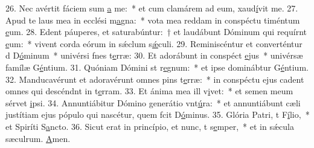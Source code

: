 26. Nec avértit fáciem sum \uline{a} me:~* et cum clamárem ad eum, xaud\uline{í}vit me.
27. Apud te laus mea in ecclési m\uline{a}gna:~* vota mea reddam in conspéctu timéntum \uline{e}um.
28. Edent páuperes, et saturabúntur:~† et laudábunt Dóminum qui requírnt \uline{e}um:~* vivent corda eórum in sǽclum s\uline{ǽ}culi.
29. Reminiscéntur et converténtur d D\uline{ó}minum~* univérsi fnes t\uline{e}rræ:
30. Et adorábunt in conspéct \uline{e}jus~* univérsæ famílæ G\uline{é}ntium.
31. Quóniam Dómini st r\uline{e}gnum:~* et ipse dominábtur G\uline{é}ntium.
32. Manducavérunt et adoravérunt omnes pins t\uline{e}rræ:~* in conspéctu ejus cadent omnes qui descéndnt in t\uline{e}rram.
33. Et ánima mea ill v\uline{i}vet:~* et semen meum sérvet \uline{i}psi.
34. Annuntiábitur Dómino generátio vnt\uline{ú}ra:~* et annuntiábunt cæli justítiam ejus pópulo qui nascétur, quem fcit D\uline{ó}minus.
35. Glória Patri, t F\uline{í}lio,~* et Spiríti S\uline{a}ncto.
36. Sicut erat in princípio, et nunc, t s\uline{e}mper,~* et in sǽcula sæculrum. \uline{A}men.
